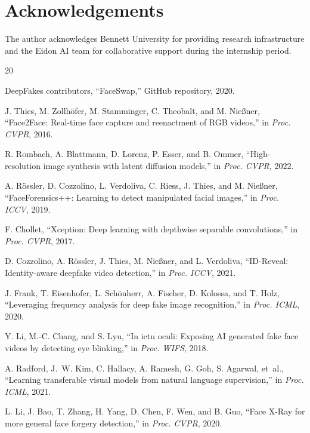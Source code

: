 \documentclass[11pt, twocolumn]{article}
\begin{document}
\section*{Acknowledgements}

The author acknowledges Bennett University for providing research infrastructure and the Eidon AI team for collaborative support during the internship period.


\begin{thebibliography}{20}

DeepFakes contributors, ``FaceSwap,'' GitHub repository, 2020.

J. Thies, M. Zollh{\"o}fer, M. Stamminger, C. Theobalt, and M. Nie{\ss}ner, ``Face2Face: Real-time face capture and reenactment of RGB videos,'' in \textit{Proc. CVPR}, 2016.

R. Rombach, A. Blattmann, D. Lorenz, P. Esser, and B. Ommer, ``High-resolution image synthesis with latent diffusion models,'' in \textit{Proc. CVPR}, 2022.

A. R{\"o}ssler, D. Cozzolino, L. Verdoliva, C. Riess, J. Thies, and M. Nie{\ss}ner, ``FaceForensics++: Learning to detect manipulated facial images,'' in \textit{Proc. ICCV}, 2019.

F. Chollet, ``Xception: Deep learning with depthwise separable convolutions,'' in \textit{Proc. CVPR}, 2017.

D. Cozzolino, A. R{\"o}ssler, J. Thies, M. Nie{\ss}ner, and L. Verdoliva, ``ID-Reveal: Identity-aware deepfake video detection,'' in \textit{Proc. ICCV}, 2021.

J. Frank, T. Eisenhofer, L. Sch{\"o}nherr, A. Fischer, D. Kolossa, and T. Holz, ``Leveraging frequency analysis for deep fake image recognition,'' in \textit{Proc. ICML}, 2020.

Y. Li, M.-C. Chang, and S. Lyu, ``In ictu oculi: Exposing AI generated fake face videos by detecting eye blinking,'' in \textit{Proc. WIFS}, 2018.

A. Radford, J.~W. Kim, C. Hallacy, A. Ramesh, G. Goh, S. Agarwal, et~al., ``Learning transferable visual models from natural language supervision,'' in \textit{Proc. ICML}, 2021.

L. Li, J. Bao, T. Zhang, H. Yang, D. Chen, F. Wen, and B. Guo, ``Face X-Ray for more general face forgery detection,'' in \textit{Proc. CVPR}, 2020.


\end{thebibliography}
\end{document}
